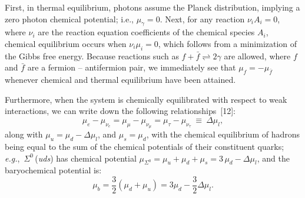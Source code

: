 \begin{mdframed}[linecolor=gray,roundcorner=12pt,backgroundcolor=Dandelion!15,linewidth=1pt,leftmargin=0cm,rightmargin=0cm,topline=true,bottomline=true,skipabove=12pt]
First, in thermal equilibrium, photons assume the Planck distribution, implying a zero photon chemical potential; i.e., $\mu_\gamma = 0$. Next, for any reaction $\nu_i A_i = 0$, where $\nu_i$ are the reaction equation coefficients of the chemical species $A_i$, chemical equilibrium occurs when $\nu_i \mu_i = 0$, which follows from a minimization of the Gibbs free energy. Because reactions such as $f + \bar{f} \rightleftharpoons 2 \gamma$ are allowed, where $f$ and $\bar{f}$ are a fermion -- antifermion pair, we immediately see that $\mu_f = -\mu_{\bar{f}}$ whenever chemical and thermal equilibrium have been attained.

Furthermore, when the system is chemically equilibrated with respect to weak interactions, we can write down the following relationships~[12]:
\begin{equation}\tag{1}\label{dmul}
\mu_e - \mu_{\nu_e}=\mu_\mu - \mu_{\nu_{\mu}}=\mu_{\tau} - \mu_{\nu_{\tau}}\ 
\equiv\ \Delta \mu_l,
\end{equation}
along with $\mu_u=\mu_d - \Delta \mu_l$, and $\mu_s=\mu_d$, with the chemical equilibrium of hadrons being equal to the sum of the chemical potentials of their constituent quarks; {\it e.g.}, $\, \Sigma^0\,$({\it uds}) has chemical potential $\mu_{\Sigma^0}=\mu_u + \mu_d + \mu_s=3\, \mu_d - \Delta \mu_l$, and the baryochemical potential is:
\begin{equation}\tag{2}
\mu_b=\frac32(\mu_d +\mu_u)=3 \mu_d -\frac32 \Delta \mu_l.
\end{equation}
  

\end{mdframed}
